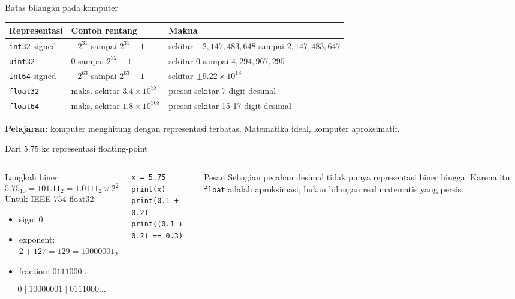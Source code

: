 \documentclass[aspectratio=169,11pt]{beamer}
\begin{document}
\begin{frame}{Batas bilangan pada komputer}
\small
\begin{tabular}{p{3cm}p{4cm}p{5cm}}
\toprule
Representasi & Contoh rentang & Makna \\
\midrule
\texttt{int32} signed & $-2^{31}$ sampai $2^{31}-1$ & sekitar $-2{,}147{,}483{,}648$ sampai $2{,}147{,}483{,}647$ \\
\texttt{uint32} & $0$ sampai $2^{32}-1$ & sekitar $0$ sampai $4{,}294{,}967{,}295$ \\
\texttt{int64} signed & $-2^{63}$ sampai $2^{63}-1$ & sekitar $\pm 9.22 \times 10^{18}$ \\
\texttt{float32} & maks. sekitar $3.4 \times 10^{38}$ & presisi sekitar 7 digit desimal \\
\texttt{float64} & maks. sekitar $1.8 \times 10^{308}$ & presisi sekitar 15-17 digit desimal \\
\bottomrule
\end{tabular}
\vspace{2mm}
\textbf{Pelajaran:} komputer menghitung dengan representasi terbatas. Matematika ideal, komputer aproksimatif.
\end{frame}

\begin{frame}[fragile]{Dari $5.75$ ke representasi floating-point}
\begin{columns}[T]
\begin{block}{Langkah biner}
\[
5.75_{10}=101.11_2=1.0111_2\times 2^2
\]
Untuk IEEE-754 float32:
\begin{itemize}
  \item sign: $0$
  \item exponent: $2+127=129=10000001_2$
  \item fraction: $0111000\ldots$
\end{itemize}
\[
\boxed{0\;|\;10000001\;|\;0111000\ldots}
\]
\end{block}
\begin{lstlisting}[style=py]
x = 5.75
print(x)
print(0.1 + 0.2)
print((0.1 + 0.2) == 0.3)
\end{lstlisting}
\begin{block}{Pesan}
Sebagian pecahan desimal tidak punya representasi biner hingga. Karena itu \texttt{float} adalah aproksimasi, bukan bilangan real matematis yang persis.
\end{block}
\end{columns}
\end{frame}
\end{document}
